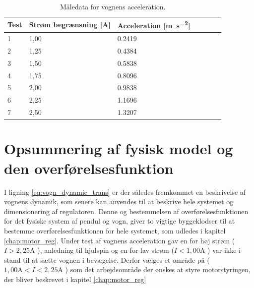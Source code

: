 \begin{table}[h!]
	\small
	\centering
	\caption{Måledata for vognens acceleration.}
	\label{tab:maaldata_vogn}
	\begin{threeparttable}
		\begin{tabular}{ l l l l l l l }
			\toprule
			\multicolumn{1}{l}{\textbf{Test}}       &
			\multicolumn{1}{l}{\textbf{Strøm begrænsning [\si{\ampere}]}}       &
			\multicolumn{1}{l}{\textbf{Acceleration [\si{\meter\per\second\squared}]}}   \\ 
			\hline
			1 &  1,00  &  \num{0.2419}  \\
			2 &  1,25  &  \num{0.4384}  \\
			3 &  1,50  &  \num{0.5838}  \\
			4 &  1,75  &  \num{0.8096}  \\
			5 &  2,00  &  \num{0.9838}  \\
			6 &  2,25  &  \num{1.1696}  \\
			7 &  2,50  &  \num{1.3207}  \\
			\hline
			\bottomrule
		\end{tabular}
	\end{threeparttable}
\end{table} 
\FloatBlock

\section{Opsummering af fysisk model og den overførelsesfunktion}

I ligning \ref{eq:vogn_dynamic_trans} er der således fremkommet en beskrivelse af vognens dynamik, som senere kan anvendes til at beskrive hele systemet og dimensionering af regulatoren.
Denne og bestemmelsen af overførelsesfunktionen for det fysiske system af pendul og vogn, giver to vigtige byggeklodser til at bestemme overførelsesfunktionen for hele systemet, som udledes i kapitel \ref{chap:motor_reg}.
Under test af vognens acceleration gav en for høj strøm ($I > 2,25 \si{\ampere} $ ), anledning til hjulspin og en for lav strøm ($I < 1,00 \si{\ampere} $ ) var ikke i stand til at sætte vognen i bevægelse.
Derfor vælges et område på ($ 1,00 \si{\ampere} <  I < 2,25 \si{\ampere} $ ) som det arbejdsområde der ønskes at styre motorstyringen, der bliver beskrevet i kapitel \ref{chap:motor_reg}



 